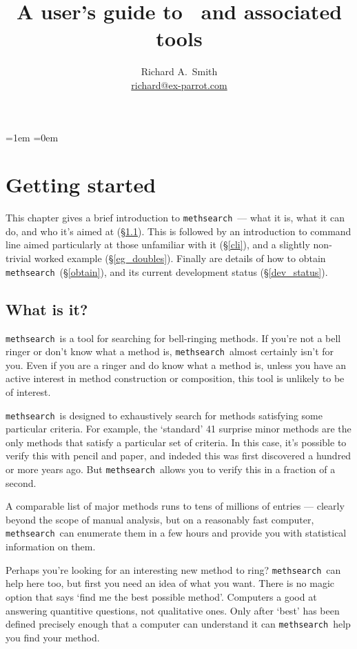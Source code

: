 \documentclass[a4paper,11pt,oneside]{book}
\title{A user's guide to \methsearch\ and associated tools}
\author{Richard A.\ Smith\\\url{richard@ex-parrot.com}}
\def\methsearch{\texttt{meth\-search}}
\newcommand{\sref}[1]{\hyperref[#1]{\S\ref{#1}}}
\begin{document}
\frontmatter
\maketitle

\tableofcontents
\parskip=1em
\parindent=0em
\addtolength{\footnotesep}{4pt}

\mainmatter

\chapter{Getting started}

This chapter gives a brief introduction to \methsearch\ --- what it is,
what it can do, and who it's aimed at (\sref{what_is_it}).  
This is followed by an introduction to command line aimed particularly 
at those unfamiliar with it (\sref{cli}), and
a slightly non-trivial worked example (\sref{eg_doubles}).  Finally are
details of how to obtain \methsearch\ (\sref{obtain}), and its
current development status (\sref{dev_status}).


\section{What is it?}\label{what_is_it}

\methsearch\ is a tool for searching for bell-ringing methods.
If you're not a bell ringer or don't know what a method is, 
\methsearch\ almost certainly isn't for you.
Even if you are a ringer and do know what a method is, unless you have 
an active interest in method construction or composition, 
this tool is unlikely to be of interest.

\methsearch\ is designed to exhaustively search for methods satisfying
some particular criteria.  For example, the `standard' 41 surprise minor
methods are the only methods that satisfy a particular set of criteria.
In this case, it's possible to verify this with pencil and paper, and 
indeded this was first discovered a hundred or more years ago.  But 
\methsearch\ allows you to verify this in a fraction of a second.

A comparable list of major methods runs to tens of millions of entries ---
clearly beyond the scope of manual analysis, but on a reasonably 
fast computer, \methsearch\ can enumerate them in a few hours and provide 
you with statistical information on them.

Perhaps you're looking for an interesting new method to ring?  
\methsearch\ can help here too, but first you need an idea of what you want.
There is no magic option that says `find me the best possible method'.
Computers a good at answering quantitive questions, not qualitative ones.
Only after `best' has been defined precisely enough that a computer 
can understand it can \methsearch\ help you find your method.
\end{document}
